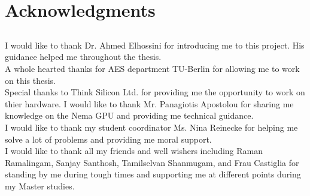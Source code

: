\chapter*{Acknowledgments}
\label{chap:ack}


\section*{}

\noindent
I would like to thank Dr. Ahmed Elhossini for introducing me to this project. His guidance helped me throughout the thesis.\\

\noindent
A whole hearted thanks for AES department TU-Berlin for allowing me to work on this thesis.\\

\noindent
Special thanks to Think Silicon Ltd. for providing me the opportunity to work on thier hardware. I would like to thank Mr. Panagiotis Apostolou for sharing me knowledge on the Nema GPU and providing me technical guidance.\\

\noindent
I would like to thank my student coordinator Ms. Nina Reinecke for helping me solve a lot of problems and providing me moral support.\\

\noindent
I would like to thank all my friends and well wishers including Raman Ramalingam, Sanjay Santhosh, Tamilselvan Shanmugam, and Frau Castiglia for standing by me during tough times and supporting me at different points during my Master studies.
